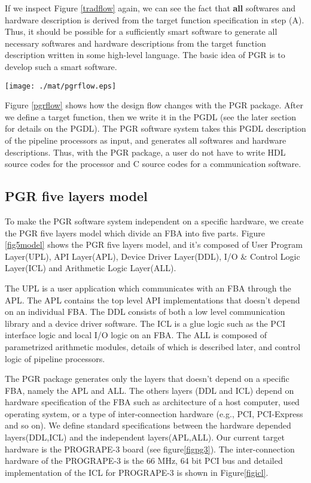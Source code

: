 \documentclass{llncs}
\begin{document}
If we inspect Figure \ref{tradflow} again, we can see the fact that
{\bfseries all} softwares and hardware description is derived from the
target function specification in step (A). Thus, it should be possible
for a sufficiently smart software to generate all necessary softwares
and hardware descriptions from the target function description written
in some high-level language. The basic idea of PGR is to develop such
a smart software.

\begin{figure*}[htb]
\begin{center}
\texttt{[image: ./mat/pgrflow.eps]}
\caption{How the design flow changes with PGR.}
\label{pgrflow}
\end{center}
\end{figure*}

Figure \ref{pgrflow} shows how the design flow changes with the PGR package.
After we define a target function, then we write it in the PGDL
(see the later section for details on the PGDL).
The PGR software system takes this PGDL description of the pipeline processors
as input, and generates all softwares and hardware descriptions.
Thus, with the PGR package, a user do not have to write HDL source codes for
the processor and C source codes for a communication software.

\subsection{PGR five layers model}
To make the PGR software system independent on a specific hardware,
we create the PGR five layers model which divide 
an FBA into five parts.
Figure \ref{fig5model} shows the PGR five layers model, 
and it's composed of User Program Layer(UPL), API Layer(APL),
Device Driver Layer(DDL), I/O \& Control Logic Layer(ICL) and
Arithmetic Logic Layer(ALL).

The UPL is a user application which communicates
with an FBA through the APL.
The APL contains the top level API implementations that
doesn't depend on an individual FBA.
The DDL consists of both a low level communication library and a device driver software. 
The ICL is a glue logic such as the PCI interface logic and 
local I/O logic on an FBA.
The ALL is composed of parametrized arithmetic modules,
details of which is described later, 
and control logic of pipeline processors.

The PGR package generates only the layers that doesn't depend on 
a specific FBA, namely the APL and ALL.
The others layers (DDL and ICL) depend on hardware specification
of the FBA such as architecture of a host computer, used operating
system, or a type of inter-connection hardware (e.g., PCI, PCI-Express and so on).
We define standard specifications between the hardware depended layers(DDL,ICL)
and the independent layers(APL,ALL).
Our current target hardware is the PROGRAPE-3 board (see figure\ref{figpg3}).
The inter-connection hardware of the PROGRAPE-3 is the 66 MHz, 64 bit PCI bus
and detailed implementation of the ICL for PROGRAPE-3
is shown in Figure\ref{figicl}.
\end{document}
